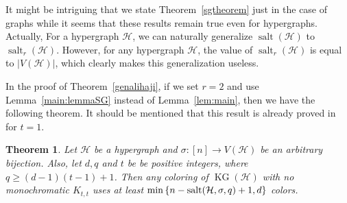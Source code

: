 \documentclass[11pt]{amsart}
\newtheorem{theorem}{Theorem} %
\theoremstyle{definition}
\theoremstyle{remark}
\def\KG{\operatorname{KG}}
\def\salt{\operatorname{salt}}
\begin{document}
It might be intriguing that we state Theorem~\ref{sgtheorem} just in the case of graphs while it seems that these results remain true even for hypergraphs. 
Actually, For a hypergraph $\mathcal{H}$, we can naturally generalize 
$\salt(\mathcal{H})$ to  $\salt_r(\mathcal{H})$.  However, for any hypergraph $\mathcal{H}$, the value of $\salt_r(\mathcal{H})$ is equal to $|V(\mathcal{H})|$, which clearly makes this generalization useless.  

In the proof of Theorem~\ref{genalihaji}, if we set $r=2$ and use Lemma~\ref{main:lemmaSG} instead of Lemma~\ref{lem:main}, then we have the following theorem. It should be mentioned that this result is already proved in~\cite{2013arXiv1302.5394A} for $t=1$.
\begin{theorem}
Let $\mathcal{H}$ be a hypergraph and $\sigma:[n]\longrightarrow V(\mathcal{H})$ be an arbitrary bijection. Also, 
let $d,q$ and $t$ be be positive integers, where  $q\geq (d-1)(t-1)+1$. Then 
any coloring of $\KG(\mathcal{H})$ with no monochromatic $K_{t,t}$ uses at least 
$\min\left\{n-{\rm salt}(\mathcal{H},\sigma,q)+1,d\right\}$ colors.
\end{theorem}
\end{document}
